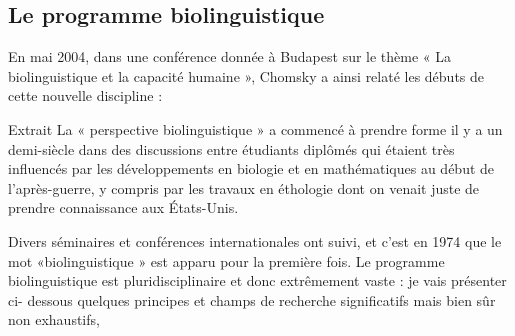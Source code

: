 \subsection{Le programme biolinguistique}
En mai 2004, dans une conférence donnée à Budapest sur le thème « La biolinguistique et la capacité
humaine », Chomsky a ainsi relaté les débuts de cette nouvelle discipline :
\begin{lecture}{Extrait}
La « perspective biolinguistique » a commencé à prendre forme il y a un demi-siècle dans des discussions entre étudiants diplômés qui étaient très influencés par les développements en biologie et en mathématiques au début de l'après-guerre, y compris par les travaux en éthologie dont on venait juste de prendre connaissance aux États-Unis.
\end{lecture}
Divers séminaires et conférences internationales ont suivi, et c'est en 1974 que le mot
«biolinguistique » est apparu pour la première fois.
Le programme biolinguistique est pluridisciplinaire et donc extrêmement vaste : je vais présenter ci-
dessous quelques principes et champs de recherche significatifs mais bien sûr non exhaustifs,

